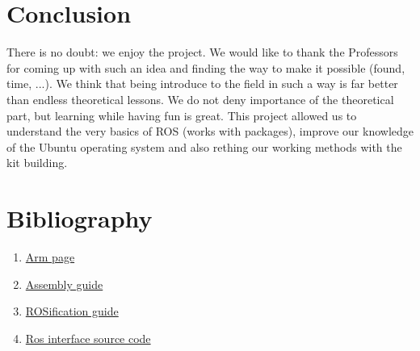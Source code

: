 \documentclass[aps,letterpaper,11pt]{revtex4}
\begin{document}
\section{Conclusion}
There is no doubt: we enjoy the project. We would like to thank the Professors for coming up with such an idea and finding the way to make it possible (found, time, ...). We think that being introduce to the field in such a way is far better than endless theoretical lessons. We do not deny importance of the theoretical part, but learning while having fun is great. 
This project allowed us to understand the very basics of ROS (works with packages), improve our knowledge of the Ubuntu operating system and also rething our working methods with the kit building. 

\section{Bibliography}
\begin{enumerate}
\item \href{http://www.trossenrobotics.com/p/PhantomX-Pincher-Robot-Arm.aspx}{Arm page}

\item \href{http://learn.trossenrobotics.com/16-interbotix/robot-arms/pincher-robot-arm/163-phantomx-pincher-robot-arm-assembly-guide.html}{Assembly guide}

\item \href{http://www.iroboapp.org/index.php?title=Getting_Started_with_Turtlebot_Arm_PhantomX_Pincher_with_ROS}{ROSification guide}

\item \href{https://github.com/turtlebot/turtlebot_arm}{Ros interface source code}
\end{enumerate}
\end{document}
